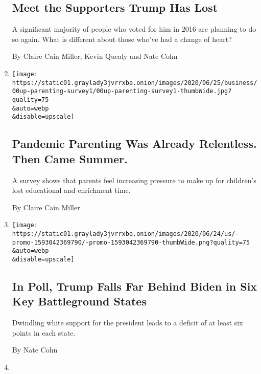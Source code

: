 \begin{enumerate}
  \hypertarget{meet-the-supporters-trump-has-lost}{%
  \subsection{Meet the Supporters Trump Has
  Lost}\label{meet-the-supporters-trump-has-lost}}

  A significant majority of people who voted for him in 2016 are
  planning to do so again. What is different about those who've had a
  change of heart?

  By Claire Cain Miller, Kevin Quealy and Nate Cohn
\item
  \href{/2020/06/26/upshot/virus-intensive-parenting-education.html}{}

  \texttt{[image: https://static01.graylady3jvrrxbe.onion/images/2020/06/25/business/00up-parenting-survey1/00up-parenting-survey1-thumbWide.jpg?quality=75\\\&auto=webp\\\&disable=upscale]}

  \hypertarget{pandemic-parenting-was-already-relentless-then-came-summer}{%
  \subsection{Pandemic Parenting Was Already Relentless. Then Came
  Summer.}\label{pandemic-parenting-was-already-relentless-then-came-summer}}

  A survey shows that parents feel increasing pressure to make up for
  children's lost educational and enrichment time.

  By Claire Cain Miller
\item
  \href{/2020/06/25/upshot/poll-2020-biden-battlegrounds.html}{}

  \texttt{[image: https://static01.graylady3jvrrxbe.onion/images/2020/06/24/us/-promo-1593042369790/-promo-1593042369790-thumbWide.png?quality=75\\\&auto=webp\\\&disable=upscale]}

  \hypertarget{in-poll-trump-falls-far-behind-biden-in-six-key-battleground-states}{%
  \subsection{In Poll, Trump Falls Far Behind Biden in Six Key
  Battleground
  States}\label{in-poll-trump-falls-far-behind-biden-in-six-key-battleground-states}}

  Dwindling white support for the president leads to a deficit of at
  least six points in each state.

  By Nate Cohn
\item
  \href{/2020/06/12/upshot/epidemiologists-decisions-children-school-coronavirus.html}{}


\end{enumerate}
